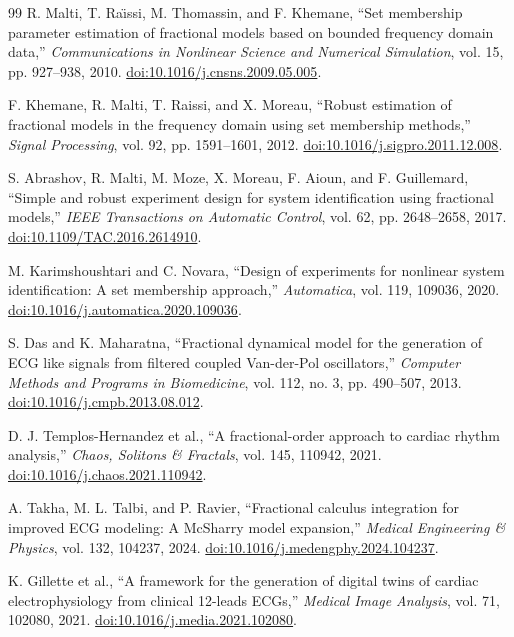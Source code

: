 \documentclass[11pt]{article}
\theoremstyle{definition}
\theoremstyle{remark}
\begin{document}
\begin{thebibliography}{99}
R. Malti, T. Ra\"{\i}ssi, M. Thomassin, and F. Khemane,
``Set membership parameter estimation of fractional models based on bounded
frequency domain data,'' \emph{Communications in Nonlinear Science and
Numerical Simulation}, vol. 15, pp. 927--938, 2010.
\href{https://doi.org/10.1016/j.cnsns.2009.05.005}{doi:10.1016/j.cnsns.2009.05.005}.

F. Khemane, R. Malti, T. Raissi, and X. Moreau,
``Robust estimation of fractional models in the frequency domain using set
membership methods,'' \emph{Signal Processing}, vol. 92, pp. 1591--1601,
2012.
\href{https://doi.org/10.1016/j.sigpro.2011.12.008}{doi:10.1016/j.sigpro.2011.12.008}.

S. Abrashov, R. Malti, M. Moze, X. Moreau, F. Aioun, and F. Guillemard,
``Simple and robust experiment design for system identification using
fractional models,'' \emph{IEEE Transactions on Automatic Control}, vol. 62,
pp. 2648--2658, 2017.
\href{https://doi.org/10.1109/TAC.2016.2614910}{doi:10.1109/TAC.2016.2614910}.

M. Karimshoushtari and C. Novara,
``Design of experiments for nonlinear system identification: A set membership
approach,'' \emph{Automatica}, vol. 119, 109036, 2020.
\href{https://doi.org/10.1016/j.automatica.2020.109036}{doi:10.1016/j.automatica.2020.109036}.

S. Das and K. Maharatna,
``Fractional dynamical model for the generation of ECG like signals from
filtered coupled Van-der-Pol oscillators,''
\emph{Computer Methods and Programs in Biomedicine}, vol. 112, no. 3,
pp. 490--507, 2013.
\href{https://doi.org/10.1016/j.cmpb.2013.08.012}{doi:10.1016/j.cmpb.2013.08.012}.

D. J. Templos-Hernandez et al.,
``A fractional-order approach to cardiac rhythm analysis,''
\emph{Chaos, Solitons \& Fractals}, vol. 145, 110942, 2021.
\href{https://doi.org/10.1016/j.chaos.2021.110942}{doi:10.1016/j.chaos.2021.110942}.

A. Takha, M. L. Talbi, and P. Ravier,
``Fractional calculus integration for improved ECG modeling: A McSharry model
expansion,'' \emph{Medical Engineering \& Physics}, vol. 132, 104237, 2024.
\href{https://doi.org/10.1016/j.medengphy.2024.104237}{doi:10.1016/j.medengphy.2024.104237}.

K. Gillette et al.,
``A framework for the generation of digital twins of cardiac
electrophysiology from clinical 12-leads ECGs,''
\emph{Medical Image Analysis}, vol. 71, 102080, 2021.
\href{https://doi.org/10.1016/j.media.2021.102080}{doi:10.1016/j.media.2021.102080}.


\end{thebibliography}
\end{document}

